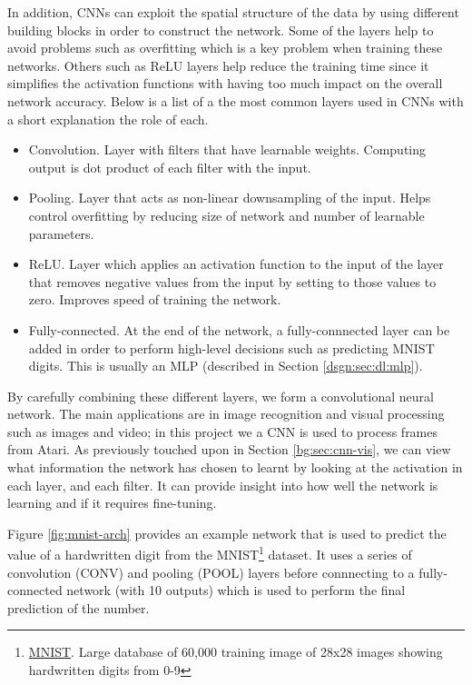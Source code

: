 In addition, CNNs can exploit the spatial structure of the data by using different building blocks in order to construct the network. Some of the layers help to avoid problems such as overfitting which is a key problem when training these networks. Others such as ReLU layers help reduce the training time since it simplifies the activation functions with having too much impact on the overall network accuracy. Below is a list of a the most common layers used in CNNs with a short explanation the role of each.

\begin{itemize}
	\item Convolution. Layer with filters that have learnable weights. Computing output is dot product of each filter with the input.
	\item Pooling. Layer that acts as non-linear downsampling of the input. Helps control overfitting by reducing size of network and number of learnable parameters.
	\item ReLU. Layer which applies an activation function to the input of the layer that removes negative values from the input by setting to those values to zero. \cite{Romanuke2017} Improves speed of training the network.
	\item Fully-connected. At the end of the network, a fully-connnected layer can be added in order to perform high-level decisions such as predicting MNIST digits. This is usually an MLP (described in Section \ref{dsgn:sec:dl:mlp}).
\end{itemize}

By carefully combining these different layers, we form a convolutional neural network. The main applications are in image recognition and visual processing such as images and video; in this project we a CNN is used to process frames from Atari. As previously touched upon in Section \ref{bg:sec:cnn-vis}, we can view what information the network has chosen to learnt by looking at the activation in each layer, and each filter. It can provide insight into how well the network is learning and if it requires fine-tuning.

Figure \ref{fig:mnist-arch} provides an example network that is used to predict the value of a hardwritten digit from the MNIST\footnote{\href{http://yann.lecun.com/exdb/mnist/}{MNIST}. Large database of 60,000 training image of 28x28 images showing hardwritten digits from 0-9} dataset. It uses a series of convolution (CONV) and pooling (POOL) layers before connnecting to a fully-connected network (with 10 outputs) which is used to perform the final prediction of the number.

